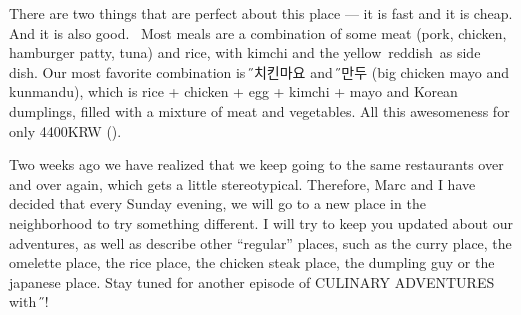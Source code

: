 \begin{post}
\begin{content}
\begin{figure}
\vspace{-12pt}
\raggedleft{}
\vspace{-24pt}
\end{figure}There are two things that are perfect about this place --- it is fast and it is cheap. And it is also good.  Most meals are a combination of some meat (pork, chicken, hamburger patty, tuna) and rice, with kimchi and the yellow reddish as side dish. Our most favorite combination is {\H 빅치킨마요} and {\H 군만두} (big chicken mayo and kunmandu), which is rice + chicken + egg + kimchi + mayo and Korean dumplings, filled with a mixture of meat and vegetables. All this awesomeness for only 4400KRW ().

Two weeks ago we have realized that we keep going to the same restaurants over and over again, which gets a little stereotypical. Therefore, Marc and I have decided that every Sunday evening, we will go to a new place in the neighborhood to try something different. I will try to keep you updated about our adventures, as well as describe other ``regular'' places, such as the curry place, the omelette place, the rice place, the chicken steak place, the dumpling guy or the japanese place. Stay tuned for another episode of CULINARY ADVENTURES with {\H 얀}!
\end{content}
\end{post}
